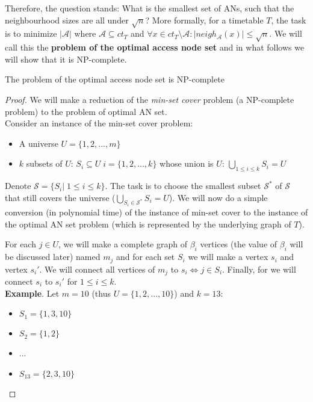 		Therefore, the question stands: What is the smallest set of ANs, such that the neighbourhood sizes are all under $\sqrt{n}$? More formally, for a timetable $T$, the task is to minimize $|\mathcal{A}|$ where $\mathcal{A} \subseteq ct_{T}$ and $\forall x \in ct_{T} \setminus \mathcal{A}: |neigh_{\mathcal{A}}(x)| \leq \sqrt{n}$. We will call this the \textbf{problem of the optimal access node set} and in what follows we will show that it is NP-complete.
		
		\begin{theorem}
			The problem of the optimal access node set is NP-complete
		\end{theorem}
		
		\begin{proof}
			We will make a reduction of the \textit{min-set cover} problem (a NP-complete problem) to the problem of optimal AN set. \\
			
			\noindent Consider an instance of the min-set cover problem:
			\begin{itemize}
				\item A universe $U = \{1, 2, ..., m\}$
				\item $k$ subsets of $U$: $S_{i} \subseteq U \; i = \{1, 2, ..., k\}$ whose union is $U$: $\bigcup\limits_{1 \leq i \leq k} S_{i} = U$
			\end{itemize}
			\hspace*{\fill}
			
			\noindent Denote $\mathcal{S} = \{S_{i}| \; 1 \leq i \leq k\}$. The task is to choose the smallest subset $\mathcal{S}^{*}$ of $\mathcal{S}$ that still covers the universe ($\bigcup\limits_{S_{i} \in \mathcal{S}^{*}} S_{i} = U$). We will now do a simple conversion (in polynomial time) of the instance of min-set cover to the instance of the optimal AN set problem (which is represented by the underlying graph of $T$).
			
			 For each $j \in U$, we will make a complete graph of $\beta_{i}$ vertices (the value of $\beta_{i}$ will be discussed later) named $m_{j}$ and for each set $S_{i}$ we will make a vertex $s_{i}$ and vertex $s_{i}'$. We will connect all vertices of $m_{j}$ to $s_{i} \iff j \in S_{i}$. Finally, for we will connect $s_{i}$ to $s_{i}'$ for $1 \leq i \leq k$. \\
			 
			\noindent \textbf{Example}. Let $m = 10$ (thus $U = \{1, 2, ..., 10\}$) and $k = 13$:
			\begin{itemize}
				\item $S_{1} = \{1, 3, 10\}$
			 	\item $S_{2} = \{1, 2\}$
			 	\item ...
			 	\item $S_{13} = \{2, 3, 10\}$
			\end{itemize}
			\hspace*{\fill}
			 

\end{proof}
